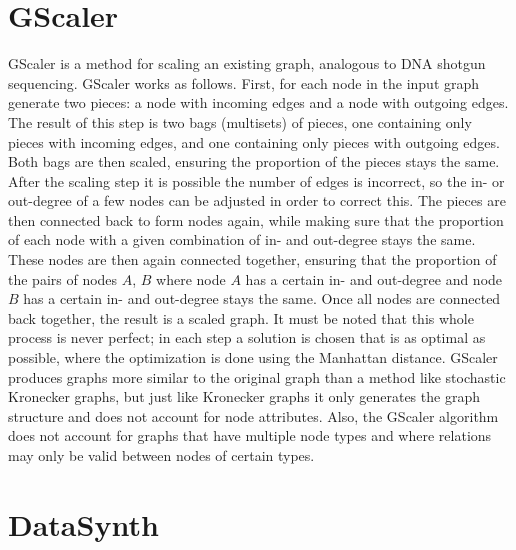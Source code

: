 \section{GScaler}
GScaler \cite{ZhangGSCALER:Graph} is a method for scaling an existing graph, analogous to DNA shotgun sequencing. GScaler works as follows. First, for each node in the input graph generate two pieces: a node with incoming edges and a node with outgoing edges. The result of this step is two bags (multisets) of pieces, one containing only pieces with incoming edges, and one containing only pieces with outgoing edges. Both bags are then scaled, ensuring the proportion of the pieces stays the same. After the scaling step it is possible the number of edges is incorrect, so the in- or out-degree of a few nodes can be adjusted in order to correct this. The pieces are then connected back to form nodes again, while making sure that the proportion of each node with a given combination of in- and out-degree stays the same. These nodes are then again connected together, ensuring that the proportion of the pairs of nodes $A$, $B$ where node $A$ has a certain in- and out-degree and node $B$ has a certain in- and out-degree stays the same. Once all nodes are connected back together, the result is a scaled graph. It must be noted that this whole process is never perfect; in each step a solution is chosen that is as optimal as possible, where the optimization is done using the Manhattan distance. GScaler produces graphs more similar to the original graph than a method like stochastic Kronecker graphs, but just like Kronecker graphs it only generates the graph structure and does not account for node attributes. Also, the GScaler algorithm does not account for graphs that have multiple node types and where relations may only be valid between nodes of certain types.

\section{DataSynth}
